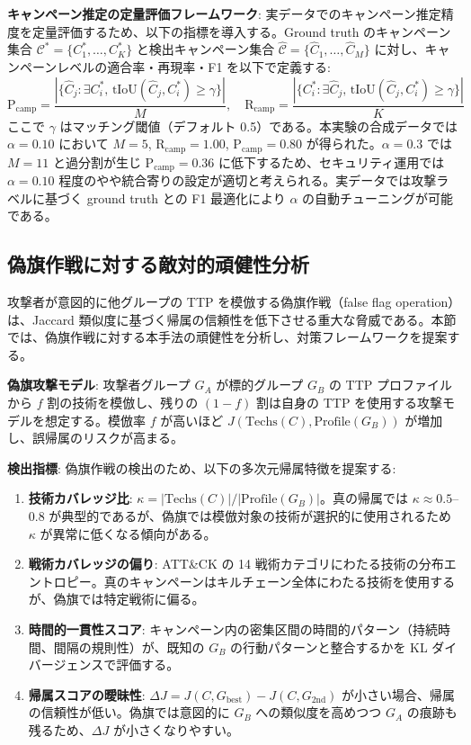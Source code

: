 \documentclass[11pt]{article}
\begin{document}
\textbf{キャンペーン推定の定量評価フレームワーク}: 実データでのキャンペーン推定精度を定量評価するため、以下の指標を導入する。Ground truth のキャンペーン集合 $\mathcal{C}^* = \{C^*_1, \ldots, C^*_K\}$ と検出キャンペーン集合 $\hat{\mathcal{C}} = \{\hat{C}_1, \ldots, \hat{C}_M\}$ に対し、キャンペーンレベルの適合率・再現率・F1 を以下で定義する:
\begin{equation}
\text{P}_{\text{camp}} = \frac{|\{\hat{C}_j : \exists C^*_i,\, \text{tIoU}(\hat{C}_j, C^*_i) \geq \gamma\}|}{M}, \quad
\text{R}_{\text{camp}} = \frac{|\{C^*_i : \exists \hat{C}_j,\, \text{tIoU}(\hat{C}_j, C^*_i) \geq \gamma\}|}{K}
\end{equation}
ここで $\gamma$ はマッチング閾値（デフォルト 0.5）である。本実験の合成データでは $\alpha = 0.10$ において $M = 5$, $\text{R}_{\text{camp}} = 1.00$, $\text{P}_{\text{camp}} = 0.80$ が得られた。$\alpha = 0.3$ では $M = 11$ と過分割が生じ $\text{P}_{\text{camp}} = 0.36$ に低下するため、セキュリティ運用では $\alpha = 0.10$ 程度のやや統合寄りの設定が適切と考えられる。実データでは攻撃ラベルに基づく ground truth との F1 最適化により $\alpha$ の自動チューニングが可能である。

\subsection{偽旗作戦に対する敵対的頑健性分析}
\label{sec:false_flag}

攻撃者が意図的に他グループの TTP を模倣する偽旗作戦（false flag operation）は、Jaccard 類似度に基づく帰属の信頼性を低下させる重大な脅威である。本節では、偽旗作戦に対する本手法の頑健性を分析し、対策フレームワークを提案する。

\textbf{偽旗攻撃モデル}: 攻撃者グループ $G_A$ が標的グループ $G_B$ の TTP プロファイルから $f$ 割の技術を模倣し、残りの $(1-f)$ 割は自身の TTP を使用する攻撃モデルを想定する。模倣率 $f$ が高いほど $J(\text{Techs}(C), \text{Profile}(G_B))$ が増加し、誤帰属のリスクが高まる。

\textbf{検出指標}: 偽旗作戦の検出のため、以下の多次元帰属特徴を提案する:
\begin{enumerate}
    \item \textbf{技術カバレッジ比}: $\kappa = |\text{Techs}(C)| / |\text{Profile}(G_B)|$。真の帰属では $\kappa \approx 0.5$--$0.8$ が典型的であるが、偽旗では模倣対象の技術が選択的に使用されるため $\kappa$ が異常に低くなる傾向がある。
    \item \textbf{戦術カバレッジの偏り}: ATT\&CK の 14 戦術カテゴリにわたる技術の分布エントロピー。真のキャンペーンはキルチェーン全体にわたる技術を使用するが、偽旗では特定戦術に偏る。
    \item \textbf{時間的一貫性スコア}: キャンペーン内の密集区間の時間的パターン（持続時間、間隔の規則性）が、既知の $G_B$ の行動パターンと整合するかを KL ダイバージェンスで評価する。
    \item \textbf{帰属スコアの曖昧性}: $\Delta J = J(C, G_{\text{best}}) - J(C, G_{\text{2nd}})$ が小さい場合、帰属の信頼性が低い。偽旗では意図的に $G_B$ への類似度を高めつつ $G_A$ の痕跡も残るため、$\Delta J$ が小さくなりやすい。
\end{enumerate}
\end{document}
